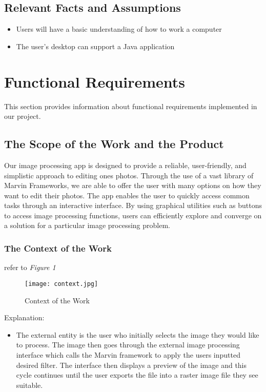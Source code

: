 \documentclass[12pt, titlepage]{article}
\begin{document}
\subsection{Relevant Facts and Assumptions}

\begin{itemize}
  \item Users will have a basic understanding of how to work a computer
  \item The user's desktop can support a Java application
\end{itemize}


\newpage

\section{Functional Requirements}

This section provides information about functional requirements implemented in our project.
\subsection{The Scope of the Work and the Product}

Our image processing app is designed to provide a reliable, user-friendly, and simplistic approach to editing ones photos. Through the use of a vast library of Marvin Frameworks, we are able to offer the user with many options on how they want to edit their photos. The app enables the user to quickly access common tasks through an interactive interface. By using graphical utilities such as buttons to access image processing functions, users can efficiently explore and converge on a solution for a particular image processing problem.

\clearpage

\subsubsection{The Context of the Work}

refer to \textit{Figure 1}

\begin{figure}[h]
	\texttt{[image: context.jpg]}
	\caption{Context of the Work}
	\end{figure}
	
Explanation:

\begin{itemize}
	\item The external entity is the user who initially selects the image they would like to process. The image then goes through the external image processing interface which calls the Marvin framework to apply the users inputted desired filter. The interface then displays a preview of the image and this cycle continues until the user exports the file into a raster image file they see suitable.
\end{itemize}
\end{document}
